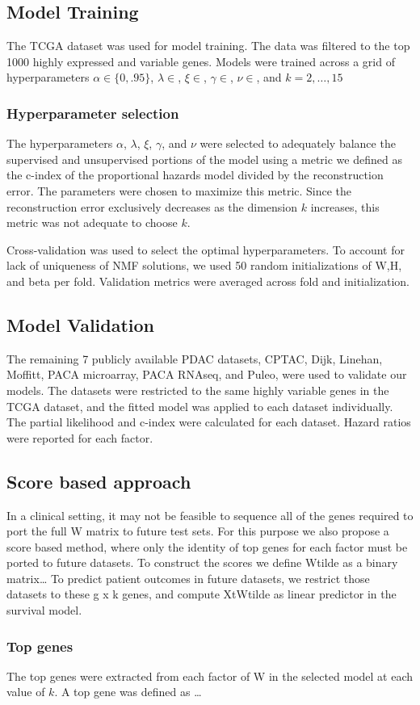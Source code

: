 \documentclass[
]{article}
\begin{document}
\subsection{Model Training}

The TCGA dataset was used for model training. The data was filtered to
the top 1000 highly expressed and variable genes. Models were trained
across a grid of hyperparameters \(\alpha \in \{0,.95\}\),
\(\lambda \in\), \(\xi \in\), \(\gamma \in\), \(\nu \in\), and
\(k = 2,\dots,15\)

\subsubsection{Hyperparameter selection}

The hyperparameters \(\alpha\), \(\lambda\), \(\xi\), \(\gamma\), and
\(\nu\) were selected to adequately balance the supervised and
unsupervised portions of the model using a metric we defined as the
c-index of the proportional hazards model divided by the reconstruction
error. The parameters were chosen to maximize this metric. Since the
reconstruction error exclusively decreases as the dimension \(k\)
increases, this metric was not adequate to choose \(k\).

Cross-validation was used to select the optimal hyperparameters. To
account for lack of uniqueness of NMF solutions, we used 50 random
initializations of W,H, and beta per fold. Validation metrics were
averaged across fold and initialization.

\subsection{Model Validation}

The remaining 7 publicly available PDAC datasets, CPTAC, Dijk, Linehan,
Moffitt, PACA microarray, PACA RNAseq, and Puleo, were used to validate
our models. The datasets were restricted to the same highly variable
genes in the TCGA dataset, and the fitted model was applied to each
dataset individually. The partial likelihood and c-index were calculated
for each dataset. Hazard ratios were reported for each factor.

\subsection{Score based approach}

In a clinical setting, it may not be feasible to sequence all of the
genes required to port the full W matrix to future test sets. For this
purpose we also propose a score based method, where only the identity of
top genes for each factor must be ported to future datasets. To
construct the scores we define Wtilde as a binary matrix\ldots{} To
predict patient outcomes in future datasets, we restrict those datasets
to these g x k genes, and compute XtWtilde as linear predictor in the
survival model.

\subsubsection{Top genes}

The top genes were extracted from each factor of W in the selected model
at each value of \(k\). A top gene was defined as \ldots{}

\showmatmethods
\showacknow
\pnasbreak
\end{document}

